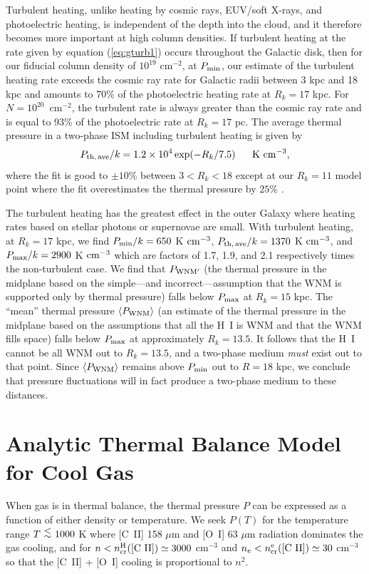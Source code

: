 \documentclass[12pt,preprint,flushrt]{aastex}
\newcommand{\beq}{\begin{equation}}
\newcommand{\eeq}{\end{equation}}
\newcommand{\ee}{$^{-2}$}
\newcommand{\al}{\mbox{ \raisebox{-.4ex}{$\stackrel{\textstyle <}{\sim}$} }}
\begin{document}
       Turbulent heating, unlike heating by cosmic rays,
 EUV/soft X-rays, and photoelectric heating, is
independent of the depth
into the cloud, and it therefore becomes more important at high
column densities.
If turbulent heating at the rate given by
equation (\ref{eq:gturb1}) occurs throughout the Galactic
disk, then
for our fiducial column density of
$10^{19}$ cm\ee, at $P_{\rm min}$, our estimate of the
turbulent heating rate
exceeds the cosmic ray rate for Galactic radii between 3 kpc and
18 kpc and amounts to 70\% of the photoelectric
heating rate at $R_k = 17$ kpc.
For $N=10^{20}$~cm\ee, the turbulent rate is always greater
than the cosmic ray rate and is equal to 93\% of the photoelectric
rate at $R_k = 17$ pc. The average thermal pressure in a two-phase ISM 
including turbulent heating is
given by
\beq
P_{\rm th,\, ave}/k =1.2\times 10^4\exp(-R_k/7.5)~~~~~{\rm K~cm^{-3}},
\eeq
where the fit is good to $\pm 10$\% between $ 3 < R_k < 18$ except at
our $R_k= 11$ model point where the fit overestimates the thermal
pressure by  $25$\% .

The turbulent heating has the greatest effect in the outer Galaxy where
heating rates based on stellar photons or supernovae are small.
With turbulent heating, at $R_k = 17$ kpc, we find
$P_{\rm min}/k = 650$ K ${\rm cm^{-3}}$,
$P_{\rm th,\, ave}/k = 1370$ K ${\rm cm^{-3}}$, and
$P_{\rm max}/k = 2900$ K ${\rm cm^{-3}}$ which are factors of
1.7, 1.9, and 2.1 respectively times the non-turbulent case.
We find that $P_{\rm WNM'}$ (the thermal pressure in
the midplane based on the simple---and incorrect---assumption
that the WNM is supported only by thermal pressure) 
falls below $P_{\rm max}$ at
$R_k = 15$ kpc.
The ``mean'' thermal pressure
$\langle P_{\rm WNM} \rangle$ 
(an estimate of the 
thermal pressure in the midplane based on the assumptions that
all the H~I is WNM and that the WNM fills space)
falls below $P_{\rm max}$ at approximately
$R_k = 13.5$. It follows that the H~I cannot be all WNM
out to $R_k=13.5$, and a two-phase medium {\it must}
exist out to that point.   
Since $\langle P_{\rm WNM} \rangle$ 
remains above $P_{\rm min}$ out to $R = 18$ kpc,
we conclude that pressure
fluctuations will in fact produce a two-phase medium to these distances.

\section{Analytic Thermal Balance Model for Cool Gas}\label{appen:toymodel}

When gas is in thermal balance, the thermal pressure $P$ can be
expressed as a function of either density or temperature. We seek
$P(T)$ for the temperature range $T\al 1000$ K where [C~II]
158 $\mu$m and [O~I] 63 $\mu$m radiation dominates the gas cooling,
and for $n < n_{\rm cr}^{\rm H}({\rm [C~II]}) \simeq 3000$ cm$^{-3}$
and $n_e < n_{\rm cr}^{\rm e}({\rm [C~II]}) \simeq 30$ cm$^{-3}$ so
that the [C~II] + [O~I] cooling is proportional to $n^2$.
\end{document}
